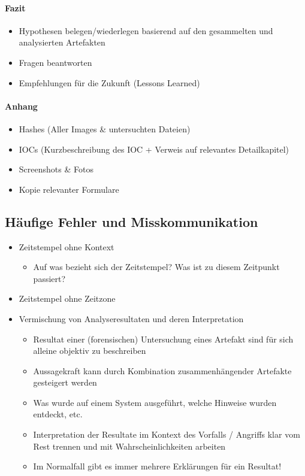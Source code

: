 \paragraph{Fazit}
\begin{itemize}
    \item Hypothesen belegen/wiederlegen basierend auf den gesammelten und analysierten Artefakten
    \item Fragen beantworten
    \item Empfehlungen für die Zukunft (Lessons Learned)
\end{itemize}

\paragraph{Anhang}
\begin{itemize}
    \item Hashes (Aller Images \& untersuchten Dateien)
    \item IOCs (Kurzbeschreibung des IOC + Verweis auf relevantes Detailkapitel)
    \item Screenshots \& Fotos
    \item Kopie relevanter Formulare
\end{itemize}

\subsection{Häufige Fehler und Misskommunikation}
\begin{itemize}
    \item Zeitstempel ohne Kontext
    \begin{itemize}
        \item Auf was bezieht sich der Zeitstempel? Was ist zu diesem Zeitpunkt passiert?
    \end{itemize}
    \item Zeitstempel ohne Zeitzone
    \item Vermischung von Analyseresultaten und deren Interpretation
    \begin{itemize}
        \item Resultat einer (forensischen) Untersuchung eines Artefakt sind für sich alleine objektiv zu beschreiben
        \item Aussagekraft kann durch Kombination zusammenhängender Artefakte gesteigert werden
        \item Was wurde auf einem System ausgeführt, welche Hinweise wurden entdeckt, etc.
        \item Interpretation der Resultate im Kontext des Vorfalls / Angriffs klar vom Rest trennen und mit Wahrscheinlichkeiten arbeiten
        \item Im Normalfall gibt es immer mehrere Erklärungen für ein Resultat!
    \end{itemize}
\end{itemize}
